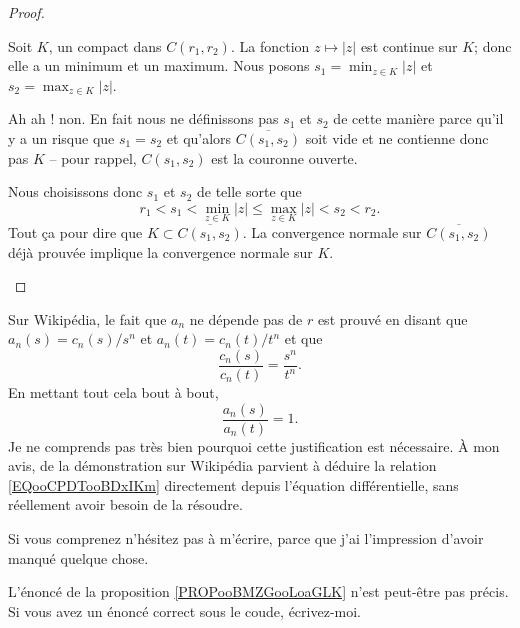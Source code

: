 \begin{proof}
\begin{subproof}
\begin{subproof}
			Soit \( K\), un compact dans \( C(r_1,r_2)\). La fonction \( z\mapsto | z |\) est continue sur \( K\); donc elle a un minimum et un maximum. Nous posons \( s_1=\min_{z\in K}| z |\) et \( s_2=\max_{z\in K}| z |\).

			Ah ah ! non. En fait nous ne définissons pas \( s_1\) et \( s_2\) de cette manière parce qu'il y a un risque que \( s_1=s_2\) et qu'alors \( \overline{ C(s_1,s_2) }\) soit vide et ne contienne donc pas \( K\) -- pour rappel, \( C(s_1,s_2)\) est la couronne ouverte.

			Nous choisissons donc \( s_1\) et \( s_2\) de telle sorte que
			\begin{equation}
				r_1 <s_1 <\min_{z\in K}| z |\leq \max_{z\in K}| z | <s_2 <r_2.
			\end{equation}
			Tout ça pour dire que \( K\subset \overline{ C(s_1,s_2) }\). La convergence normale sur \( \overline{ C(s_1,s_2) }\) déjà prouvée implique la convergence normale sur \( K\).
		\end{subproof}
	\end{subproof}
\end{proof}

\begin{probleme}        \label{PROPBooYWDNooMXVPLJ}
	Sur Wikipédia\cite{BIBooUBUAooHyhrlg}, le fait que \( a_n\) ne dépende pas de \( r\) est prouvé en disant que \( a_n(s)=c_n(s)/s^n\) et \( a_n(t)=c_n(t)/t^n\) et que
	\begin{equation}        \label{EQooCPDTooBDxIKm}
		\frac{ c_n(s) }{ c_n(t) }=\frac{ s^n }{ t^n }.
	\end{equation}
	En mettant tout cela bout à bout,
	\begin{equation}
		\frac{ a_n(s) }{ a_n(t) }=1.
	\end{equation}
	Je ne comprends pas très bien pourquoi cette justification est nécessaire. À mon avis,  de la démonstration sur Wikipédia parvient à déduire la relation \eqref{EQooCPDTooBDxIKm} directement depuis l'équation différentielle, sans réellement avoir besoin de la résoudre.

	Si vous comprenez n'hésitez pas à m'écrire, parce que j'ai l'impression d'avoir manqué quelque chose.
\end{probleme}

\begin{probleme}
	L'énoncé de la proposition \ref{PROPooBMZGooLoaGLK} n'est peut-être pas précis. Si vous avez un énoncé correct sous le coude, écrivez-moi.
\end{probleme}

